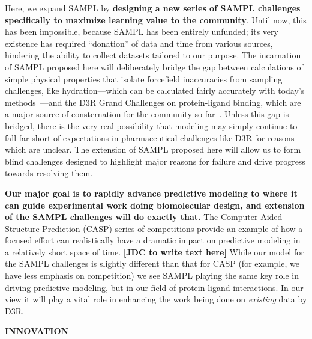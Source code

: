 \documentclass[11pt]{article}
\begin{document}
Here, we expand SAMPL by \textbf{designing a new series of SAMPL challenges specifically to maximize learning value to the community}.
Until now, this has been impossible, because SAMPL has been entirely unfunded; its very existence has required ``donation'' of data and time from various sources, hindering the ability to collect datasets tailored to our purpose. 
The incarnation of SAMPL proposed here will deliberately bridge the gap between calculations of simple physical properties that isolate forcefield inaccuracies from sampling challenges, like hydration---which can be calculated fairly accurately with today's methods~\cite{mobley_blind_2014-1}---and the D3R Grand Challenges on protein-ligand binding, which are a major source of consternation for the community so far~\cite{ignjatovic_binding-affinity_2016, deng_large_2016, sunseri_d3r_2016, gathiaka_d3r_2016}.
Unless this gap is bridged, there is the very real possibility that modeling may simply continue to fall far short of expectations in pharmaceutical challenges like D3R for reasons which are unclear.
The extension of SAMPL proposed here will allow us to form blind challenges designed to highlight major reasons for failure and drive progress towards resolving them.

\textbf{Our major goal is to rapidly advance predictive modeling to where it can guide experimental work doing biomolecular design, and extension of the SAMPL challenges will do exactly that.}
The Computer Aided Structure Prediction (CASP) series of competitions provide an example of how a focused effort can realistically have a dramatic impact on predictive modeling in a relatively short space of time.  {\bf [JDC to write text here]}
While our model for the SAMPL challenges is slightly different than that for CASP (for example, we have less emphasis on competition) we see SAMPL playing the same key role in driving predictive modeling, but in our field of protein-ligand interactions. 
In our view it will play a vital role in enhancing the work being done on \emph{existing} data by D3R. 



{\large \bf INNOVATION}
\end{document}
